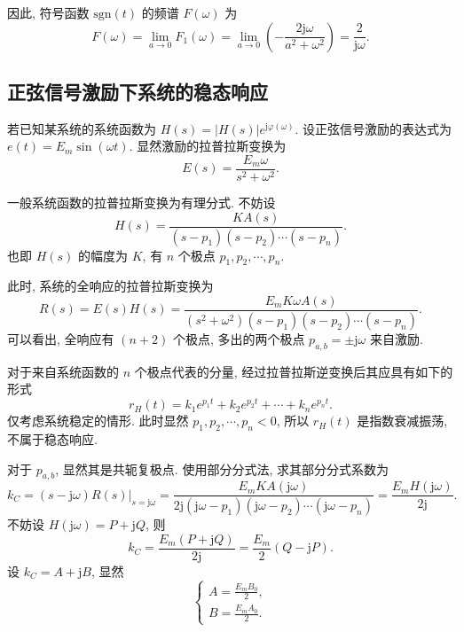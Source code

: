 因此, 符号函数 $\mathrm{sgn}(t)$ 的频谱 $F(\omega)$ 为
\begin{equation}
    F(\omega)=\lim_{a\rightarrow 0}F_1(\omega)=\lim_{a\rightarrow 0}\left(-\frac{2\mathrm{j}\omega}{a^2+\omega^2}\right)=\frac{2}{\mathrm{j}\omega}.
\end{equation}

\subsection{正弦信号激励下系统的稳态响应} \label{proofs 正弦信号激励下系统的稳态响应}
若已知某系统的系统函数为 $H(s)=|H(s)|e^{\mathrm{j}\varphi(\omega)}$. 设正弦信号激励的表达式为 $e(t)=E_m\sin(\omega t)$. 显然激励的拉普拉斯变换为
\begin{equation}
    E(s)=\frac{E_m\omega}{s^2+\omega^2}.
\end{equation}

一般系统函数的拉普拉斯变换为有理分式. 不妨设
\begin{equation}
    H(s)=\frac{KA(s)}{(s-p_1)(s-p_2)\cdots(s-p_n)}.
\end{equation}
也即 $H(s)$ 的幅度为 $K$, 有 $n$ 个极点 $p_1,p_2,\cdots,p_n$.

此时, 系统的全响应的拉普拉斯变换为
\begin{equation}
    R(s)=E(s)H(s)=\frac{E_mK\omega A(s)}{(s^2+\omega^2)(s-p_1)(s-p_2)\cdots(s-p_n)}.
\end{equation}
可以看出, 全响应有 $(n+2)$ 个极点, 多出的两个极点 $p_{a,b}=\pm\mathrm{j}\omega$ 来自激励.

对于来自系统函数的 $n$ 个极点代表的分量, 经过拉普拉斯逆变换后其应具有如下的形式
\begin{equation}
    r_{H}(t)=k_1e^{p_1t}+k_2e^{p_2t}+\cdots+k_ne^{p_nt}.
\end{equation}
仅考虑系统稳定的情形. 此时显然 $p_1,p_2,\cdots,p_n<0$, 所以 $r_H(t)$ 是指数衰减振荡, 不属于稳态响应.

对于 $p_{a,b}$, 显然其是共轭复极点. 使用部分分式法, 求其部分分式系数为
\begin{equation}
    k_C=(s-\mathrm{j}\omega)R(s)|_{s=\mathrm{j}\omega}=\frac{E_mKA(\mathrm{j}\omega)}{2\mathrm{j}(\mathrm{j}\omega-p_1)(\mathrm{j}\omega-p_2)\cdots(\mathrm{j}\omega-p_n)}=\frac{E_mH(\mathrm{j}\omega)}{2\mathrm{j}}.
\end{equation}
不妨设 $H(\mathrm{j}\omega)=P+\mathrm{j}Q$, 则
\begin{equation}
    k_C=\frac{E_m(P+\mathrm{j}Q)}{2\mathrm{j}}=\frac{E_m}{2}(Q-\mathrm{j}P).
\end{equation}
设 $k_C=A+\mathrm{j}B$, 显然
\begin{equation}
    \begin{cases}
        A=\frac{E_mB_0}{2}, \\
        B=\frac{E_mA_0}{2}.
    \end{cases}
\end{equation}

